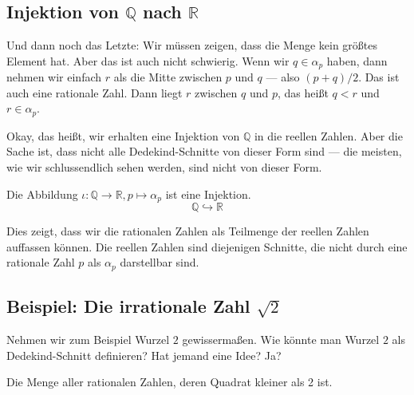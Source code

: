 \subsection{Injektion von \texorpdfstring{$\mathbb{Q}$}{Q} nach \texorpdfstring{$\mathbb{R}$}{R}}

\begin{spoken-clean}[00:35:23 - 00:37:12]
Und dann noch das Letzte: Wir müssen zeigen, dass die Menge kein größtes Element hat. Aber das ist auch nicht schwierig. Wenn wir $q \in \alpha_p$ haben, dann nehmen wir einfach $r$ als die Mitte zwischen $p$ und $q$ --- also $(p + q) / 2$. Das ist auch eine rationale Zahl. Dann liegt $r$ zwischen $q$ und $p$, das heißt $q < r$ und $r \in \alpha_p$.

Okay, das heißt, wir erhalten eine Injektion von $\mathbb{Q}$ in die reellen Zahlen. Aber die Sache ist, dass nicht alle Dedekind-Schnitte von dieser Form sind --- die meisten, wie wir schlussendlich sehen werden, sind nicht von dieser Form.
\end{spoken-clean}

\begin{math-stroke}
Die Abbildung $\iota \colon \mathbb{Q} \to \mathbb{R}, p \mapsto \alpha_p$ ist eine Injektion.
\[ \mathbb{Q} \hookrightarrow \mathbb{R} \]
\begin{explanation-of-steps}
Dies zeigt, dass wir die rationalen Zahlen als Teilmenge der reellen Zahlen auffassen können. Die  reellen Zahlen sind diejenigen Schnitte, die nicht durch eine rationale Zahl $p$ als $\alpha_p$ darstellbar sind.
\end{explanation-of-steps}
\end{math-stroke}

\subsection{Beispiel: Die irrationale Zahl \texorpdfstring{$\sqrt{2}$}{Wurzel 2}}

\begin{spoken-clean}[00:37:12 - 00:39:57]
Nehmen wir zum Beispiel Wurzel $2$ gewissermaßen. Wie könnte man Wurzel $2$ als Dedekind-Schnitt definieren? Hat jemand eine Idee? Ja?
\end{spoken-clean}

\begin{student-interaction}
Die Menge aller rationalen Zahlen, deren Quadrat kleiner als 2 ist.
\end{student-interaction}

